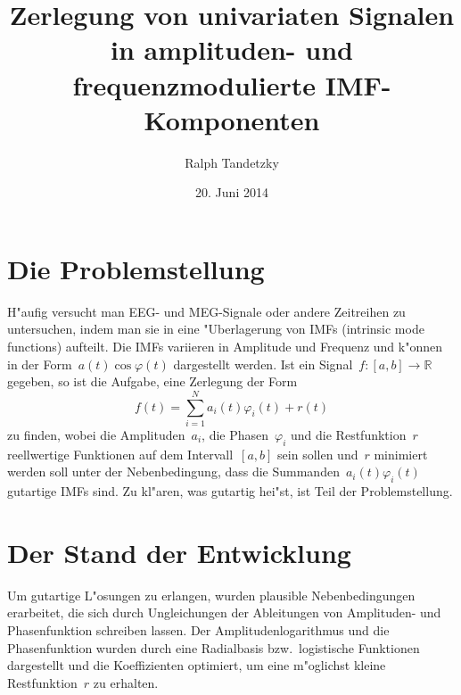 \documentclass[a4paper]{scrartcl}
\newcommand{\R}{{\mathbb{R}}}
\newcommand{\pphi}{{\varphi}}
\begin{document}

\title{Zerlegung von univariaten Signalen in amplituden- und frequenzmodulierte IMF-Komponenten}
\author{Ralph Tandetzky}
\date{20. Juni 2014}
\maketitle

\section{Die Problemstellung}

H"aufig versucht man EEG- und MEG-Signale oder andere Zeitreihen zu untersuchen, indem man sie in eine "Uberlagerung von IMFs (intrinsic mode functions) aufteilt. 
Die IMFs variieren in Amplitude und Frequenz und k"onnen in der Form~$a(t)\cos\pphi(t)$ dargestellt werden. 
Ist ein Signal~$f:[a,b]\to\R$ gegeben, so ist die Aufgabe, eine Zerlegung der Form 
$$ f(t) = \sum_{i=1}^N a_i(t)\pphi_i(t) + r(t) $$
zu finden, wobei die Amplituden~$a_i$, die Phasen~$\pphi_i$ und die Restfunktion~$r$ reellwertige Funktionen auf dem Intervall~$[a,b]$ sein sollen und~$r$ minimiert werden soll unter der Nebenbedingung, dass die Summanden~$a_i(t)\pphi_i(t)$ gutartige IMFs sind. 
Zu kl"aren, was \glqq{}gutartig\grqq{} hei"st, ist Teil der Problemstellung. 


\section{Der Stand der Entwicklung}

Um gutartige L"osungen zu erlangen, wurden plausible Nebenbedingungen erarbeitet, die sich durch Ungleichungen der Ableitungen von Amplituden- und Phasenfunktion schreiben lassen. 
Der Amplitudenlogarithmus und die Phasenfunktion wurden durch eine Radialbasis bzw.~logistische Funktionen dargestellt und die Koeffizienten optimiert, um eine m"oglichst kleine Restfunktion~$r$ zu erhalten. 



%





\end{document}
